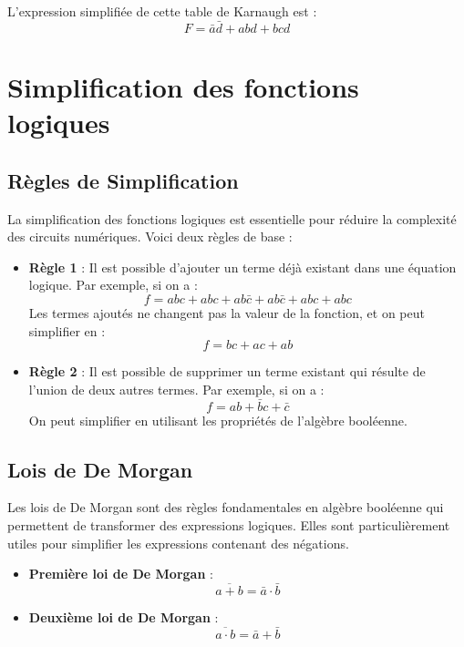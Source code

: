 \documentclass[10pt,a4paper]{article}
\begin{document}
L'expression simplifiée de cette table de Karnaugh est :
\[ F = \bar{a}\bar{d} + abd + bcd \]

\section*{Simplification des fonctions logiques}

\subsection*{Règles de Simplification}

La simplification des fonctions logiques est essentielle pour réduire la complexité des circuits numériques. Voici deux règles de base :

\begin{itemize}
    \item \textbf{Règle 1} : Il est possible d'ajouter un terme déjà existant dans une équation logique. Par exemple, si on a :
    \[ f = abc + abc + ab\bar{c} + ab\bar{c} + abc + abc \]
    Les termes ajoutés ne changent pas la valeur de la fonction, et on peut simplifier en :
    \[ f = bc + ac + ab \]


    \item \textbf{Règle 2} : Il est possible de supprimer un terme existant qui résulte de l'union de deux autres termes. Par exemple, si on a :
    \[ f = ab + \bar{b}c + \bar{c} \]
    On peut simplifier en utilisant les propriétés de l'algèbre booléenne.

\end{itemize}

\subsection*{Lois de De Morgan}

Les lois de De Morgan sont des règles fondamentales en algèbre booléenne qui permettent de transformer des expressions logiques. Elles sont particulièrement utiles pour simplifier les expressions contenant des négations.

\begin{itemize}
    \item \textbf{Première loi de De Morgan} :
    \[ \overline{a + b} = \bar{a} \cdot \bar{b} \]

    \item \textbf{Deuxième loi de De Morgan} :
    \[ \overline{a \cdot b} = \bar{a} + \bar{b} \]

\end{itemize}
\end{document}

